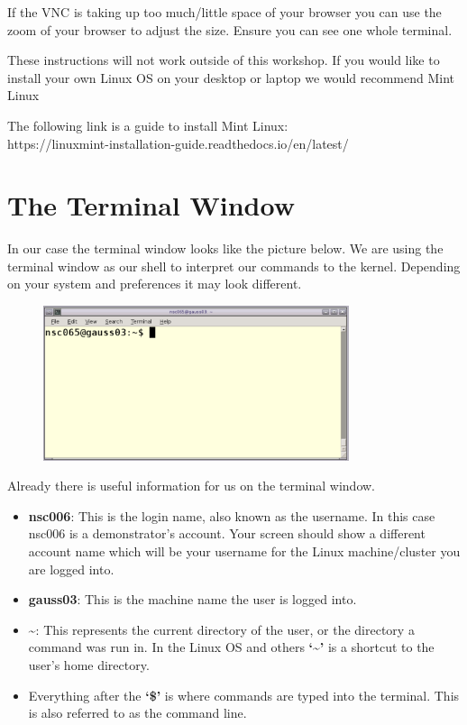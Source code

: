 \documentclass[
  letterpaper,
  DIV=11,
  numbers=noendperiod]{scrreprt}
\providecommand{\tightlist}{%
  \setlength{\itemsep}{0pt}\setlength{\parskip}{0pt}}\usepackage{longtable,booktabs,array}
\begin{document}
If the VNC is taking up too much/little space of your browser you can
use the zoom of your browser to adjust the size. Ensure you can see one
whole terminal.

These instructions will not work outside of this workshop. If you would
like to install your own Linux OS on your desktop or laptop we would
recommend Mint Linux

The following link is a guide to install Mint Linux:\\
https://linuxmint-installation-guide.readthedocs.io/en/latest/

\hypertarget{the-terminal-window}{%
\section{The Terminal Window}\label{the-terminal-window}}

In our case the terminal window looks like the picture below. We are
using the terminal window as our shell to interpret our commands to the
kernel. Depending on your system and preferences it may look different.

\begin{figure}

{\centering \includegraphics[width=0.8\textwidth,height=\textheight]{figures/terminal_window.png}

}

\end{figure}

Already there is useful information for us on the terminal window.

\begin{itemize}
\tightlist
\item
  \textbf{nsc006}: This is the login name, also known as the username.
  In this case nsc006 is a demonstrator's account. Your screen should
  show a different account name which will be your username for the
  Linux machine/cluster you are logged into.
\item
  \textbf{gauss03}: This is the machine name the user is logged into.
\item
  \textbf{\textasciitilde{}}: This represents the current directory of
  the user, or the directory a command was run in. In the Linux OS and
  others \textbf{`\textasciitilde{}'} is a shortcut to the user's home
  directory.
\item
  Everything after the \textbf{`\$'} is where commands are typed into
  the terminal. This is also referred to as the command line.
\end{itemize}
\end{document}

